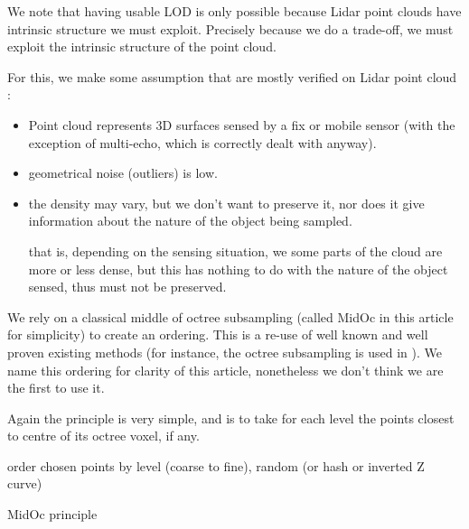 			We note that having usable LOD is only possible because Lidar point clouds have intrinsic structure we must exploit. 
			Precisely because we do a trade-off, we must exploit the intrinsic structure of the point cloud.
			
			For this, we make some assumption that are mostly verified on Lidar point cloud  :			
			\begin{itemize}
			
				\item Point cloud represents 3D surfaces sensed by a fix or mobile sensor (with the exception of multi-echo, which is correctly dealt with anyway).
				\item geometrical noise (outliers) is low.
				\item the density may vary, but we don't want to preserve it, nor does it give information about the nature of the object being sampled.
				
				that is, depending on the sensing situation, we some parts of the cloud are more or less dense, but this has nothing to do with the nature of the object sensed, thus must not be preserved.
			\end{itemize}
			We rely on a classical middle of octree subsampling (called MidOc in this article for simplicity) to create an ordering. This is a re-use of well known and well proven existing methods (for instance, the octree subsampling is used in ).
			We name this ordering for clarity of this article, nonetheless we don't think we are the first to use it.
			
			
			Again the principle is very simple, and is to take for each level the points closest to centre of its octree voxel, if any.
			\begin{algorithm}
				
				order chosen points by level (coarse to fine), random (or hash or inverted Z curve)\;
				\caption{MidOc principle}
			\end{algorithm} 
			 
